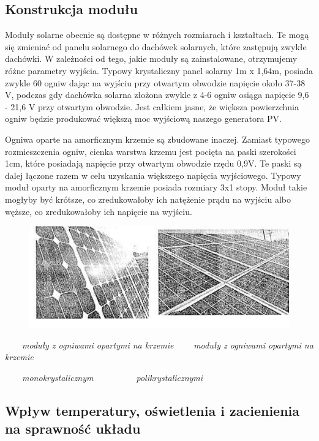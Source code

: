 \documentclass[12pt,a4paper]{article}
\begin{document}
\subsection{Konstrukcja modułu}

Moduły solarne obecnie są dostępne w różnych rozmiarach i kształtach. Te mogą się zmieniać od panelu solarnego do dachówek solarnych, które zastępują zwykłe dachówki. W zależności od tego, jakie moduły są zainstalowane, otrzymujemy różne parametry wyjścia. Typowy krystaliczny panel solarny 1m x 1,64m, posiada zwykle 60 ogniw dając na wyjściu przy otwartym obwodzie napięcie około 37-38 V, podczas gdy dachówka solarna złożona zwykle z 4-6 ogniw osiąga napięcie 9,6 - 21,6 V przy otwartym obwodzie. Jest całkiem jasne, że większa powierzchnia ogniw będzie produkować większą moc wyjściową naszego generatora PV. 

Ogniwa oparte na amorficznym krzemie są zbudowane inaczej. Zamiast typowego rozmieszczenia ogniw, cienka warstwa krzemu jest pocięta na paski szerokości 1cm, które posiadają napięcie przy otwartym obwodzie rzędu 0,9V. Te paski są dalej łączone razem w celu uzyskania większego napięcia wyjściowego. Typowy moduł oparty na amorficznym krzemie posiada rozmiary 3x1 stopy. Moduł takie mogłyby być krótsze, co zredukowałoby ich natężenie prądu na wyjściu albo węższe, co zredukowałoby ich napięcie na wyjściu. 

\begin{figure}[h]
\centering
\includegraphics[natwidth=13.60cm,natheight=5.34cm]{media/image8.jpg}
\end{figure}
 

\ \ \ \ \textit{moduły z ogniwami opartymi na krzemie }\ \ \ \ 
\textit{moduły z ogniwami opartymi na krzemie }

\ \ \ \ \textit{monokrystalicznym }\ \ \ \ \textit{ }\ \ \ \ \textit{
polikrystalicznymi }

\subsection{Wpływ temperatury, oświetlenia i zacienienia na sprawność układu}
\end{document}
